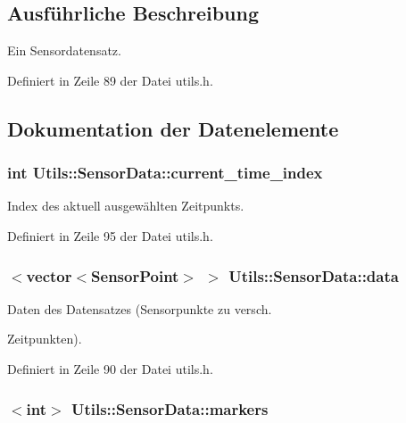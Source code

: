 \subsection{Ausführliche Beschreibung}
Ein Sensordatensatz. 

Definiert in Zeile 89 der Datei utils.\-h.



\subsection{Dokumentation der Datenelemente}
\hypertarget{structUtils_1_1SensorData_a177d53154d56fcf1962f969ece1e7d9d}{
\subsubsection[{current\-\_\-time\-\_\-index}]{\setlength{\rightskip}{0pt plus 5cm}int Utils\-::\-Sensor\-Data\-::current\-\_\-time\-\_\-index}}\label{structUtils_1_1SensorData_a177d53154d56fcf1962f969ece1e7d9d}


Index des aktuell ausgewählten Zeitpunkts. 



Definiert in Zeile 95 der Datei utils.\-h.

\hypertarget{structUtils_1_1SensorData_ae94e7645dc0b6adfd21571b0abd5e309}{
\subsubsection[{data}]{$<${\bf vector}$<${\bf Sensor\-Point}$>$ $>$ Utils\-::\-Sensor\-Data\-::data}}\label{structUtils_1_1SensorData_ae94e7645dc0b6adfd21571b0abd5e309}


Daten des Datensatzes (Sensorpunkte zu versch. 

Zeitpunkten). 

Definiert in Zeile 90 der Datei utils.\-h.

\hypertarget{structUtils_1_1SensorData_ac2d7e037f39affd6ad9d4aa29ed579da}{
\subsubsection[{markers}]{$<$int$>$ Utils\-::\-Sensor\-Data\-::markers}}\label{structUtils_1_1SensorData_ac2d7e037f39affd6ad9d4aa29ed579da}


